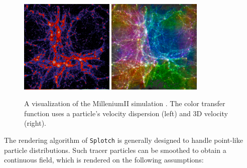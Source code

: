 \begin{figure}
\begin{center}
\includegraphics[width=0.40\textwidth]{millenium2_veldisp.pdf}
\includegraphics[width=0.40\textwidth]{millenium2_vel.pdf}
\end{center}
\caption{A visualization  of the MilleniumII simulation \citep{2009MNRAS.398.1150B}. The color transfer function uses a particle's velocity dispersion (left) and 3D velocity (right).}\label{mil2}
\end{figure}

The rendering algorithm of {\tt Splotch} is generally designed to handle
point-like particle distributions. Such tracer particles can be smoothed
to obtain a continuous field, which is rendered
on the following assumptions:

